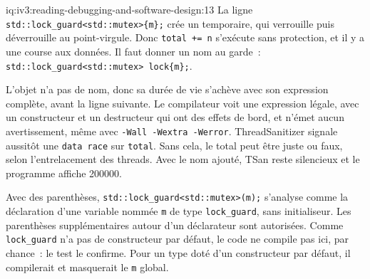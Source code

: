 \begin{solution}{iq:iv3:reading-debugging-and-software-design:13}
La ligne \texttt{std::lock\_guard<std::mutex>\{m\};} crée un temporaire, qui verrouille puis déverrouille au point-virgule. Donc \texttt{total += n} s'exécute sans protection, et il y a une course aux données. Il faut donner un nom au garde~: \texttt{std::lock\_guard<std::mutex> lock\{m\};}.

L'objet n'a pas de nom, donc sa durée de vie s'achève avec son expression complète, avant la ligne suivante. Le compilateur voit une expression légale, avec un constructeur et un destructeur qui ont des effets de bord, et n'émet aucun avertissement, même avec \texttt{-Wall -Wextra -Werror}. ThreadSanitizer signale aussitôt une \texttt{data race} sur \texttt{total}. Sans cela, le total peut être juste ou faux, selon l'entrelacement des threads. Avec le nom ajouté, TSan reste silencieux et le programme affiche 200000.

Avec des parenthèses, \texttt{std::lock\_guard<std::mutex>(m);} s'analyse comme la déclaration d'une variable nommée \texttt{m} de type \texttt{lock\_guard}, sans initialiseur. Les parenthèses supplémentaires autour d'un déclarateur sont autorisées. Comme \texttt{lock\_guard} n'a pas de constructeur par défaut, le code ne compile pas ici, par chance~: le test le confirme. Pour un type doté d'un constructeur par défaut, il compilerait et masquerait le \texttt{m} global.


\end{solution}

